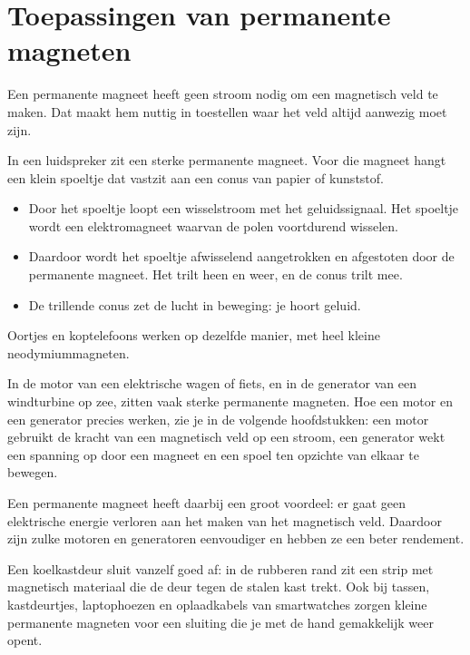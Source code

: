 \documentclass{ximera}
\begin{document}
\section{Toepassingen van permanente magneten}\label{sec:toepassingen-permanente-magneet}
Een permanente magneet heeft geen stroom nodig om een magnetisch veld te maken. Dat maakt hem nuttig in toestellen waar het veld altijd aanwezig moet zijn.

\begin{example}[foldable=true,title={Luidspreker en oortjes}]\nl
    In een luidspreker zit een sterke permanente magneet. Voor die magneet hangt een klein spoeltje dat vastzit aan een conus van papier of kunststof.
    \begin{itemize}
        \item Door het spoeltje loopt een wisselstroom met het geluidssignaal. Het spoeltje wordt een elektromagneet waarvan de polen voortdurend wisselen.
        \item Daardoor wordt het spoeltje afwisselend aangetrokken en afgestoten door de permanente magneet. Het trilt heen en weer, en de conus trilt mee.
        \item De trillende conus zet de lucht in beweging: je hoort geluid.
    \end{itemize}
    Oortjes en koptelefoons werken op dezelfde manier, met heel kleine neodymiummagneten.
\end{example}

\begin{example}[foldable=true,title={Elektromotor en generator}]\nl
    In de motor van een elektrische wagen of fiets, en in de generator van een windturbine op zee, zitten vaak sterke permanente magneten. Hoe een motor en een generator precies werken, zie je in de volgende hoofdstukken: een motor gebruikt de kracht van een magnetisch veld op een stroom, een generator wekt een spanning op door een magneet en een spoel ten opzichte van elkaar te bewegen.

    Een permanente magneet heeft daarbij een groot voordeel: er gaat geen elektrische energie verloren aan het maken van het magnetisch veld. Daardoor zijn zulke motoren en generatoren eenvoudiger en hebben ze een beter rendement.
\end{example}

\begin{example}[foldable=true,title={Magneetsluitingen}]\nl
    Een koelkastdeur sluit vanzelf goed af: in de rubberen rand zit een strip met magnetisch materiaal die de deur tegen de stalen kast trekt. Ook bij tassen, kastdeurtjes, laptophoezen en oplaadkabels van smartwatches zorgen kleine permanente magneten voor een sluiting die je met de hand gemakkelijk weer opent.
\end{example}
\end{document}
